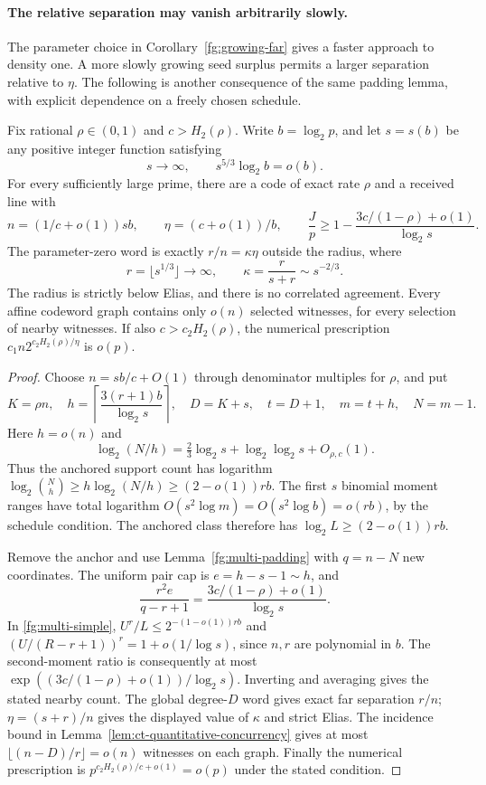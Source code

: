 \paragraph{The relative separation may vanish arbitrarily slowly.}
The parameter choice in Corollary~\ref{fg:growing-far} gives a faster
approach to density one. A more slowly growing seed surplus permits
a larger separation relative to $\eta$. The following is another consequence of the same padding
lemma, with explicit dependence on a freely chosen schedule.

\begin{corollary}
\label{fg:slow-separation}
Fix rational $\rho\in(0,1)$ and $c>H_2(\rho)$. Write $b=\log_2p$,
and let $s=s(b)$ be any positive integer function satisfying
\[
 s\longrightarrow\infty,\qquad s^{5/3}\log_2b=o(b).
\]
For every sufficiently large prime, there are a code of exact rate
$\rho$ and a received line with
\[
 n=(1/c+o(1))sb,\qquad \eta=(c+o(1))/b,\qquad
 \frac Jp\ge1-\frac{3c/(1-\rho)+o(1)}{\log_2s}.
\]
The parameter-zero word is exactly $r/n=\kappa\eta$ outside the radius,
where
\[
 r=\lfloor s^{1/3}\rfloor\to\infty,
 \qquad \kappa=\frac r{s+r}\sim s^{-2/3}.
\]
The radius is strictly below Elias, and there is no correlated agreement.
Every affine codeword graph contains only $o(n)$ selected witnesses,
for every selection of nearby witnesses. If also $c>c_2H_2(\rho)$,
the numerical prescription $c_1n2^{c_2H_2(\rho)/\eta}$ is $o(p)$.
\end{corollary}
\begin{proof}
Choose $n=sb/c+O(1)$ through denominator multiples for $\rho$, and put
\[
 K=\rho n,\quad h=\left\lceil\frac{3(r+1)b}{\log_2s}\right\rceil,
 \quad D=K+s,\quad t=D+1,\quad m=t+h,\quad N=m-1.
\]
Here $h=o(n)$ and
\[
 \log_2(N/h)=\tfrac23\log_2s+\log_2\log_2s+O_{\rho,c}(1).
\]
Thus the anchored support count has logarithm
$\log_2\binom Nh\ge h\log_2(N/h)\ge(2-o(1))rb$.
The first $s$ binomial moment ranges have total logarithm
$O(s^2\log m)=O(s^2\log b)=o(rb)$, by the schedule condition.
The anchored class therefore has
$\log_2L\ge(2-o(1))rb$.

Remove the anchor and use Lemma~\ref{fg:multi-padding} with
$q=n-N$ new coordinates. The uniform pair cap is
$e=h-s-1\sim h$, and
\[
 \frac{r^2e}{q-r+1}
 =\frac{3c/(1-\rho)+o(1)}{\log_2s}.
\]
In \eqref{fg:multi-simple}, $U^r/L\le2^{-(1-o(1))rb}$ and
$(U/(R-r+1))^r=1+o(1/\log s)$, since $n,r$ are polynomial in $b$.
The second-moment ratio is consequently at most
$\exp((3c/(1-\rho)+o(1))/\log_2s)$.
Inverting and averaging gives the stated nearby count.
The global degree-$D$ word gives exact far separation $r/n$;
$\eta=(s+r)/n$ gives the displayed value of $\kappa$ and strict Elias.
The incidence bound in Lemma~\ref{lem:ct-quantitative-concurrency}
gives at most $\lfloor(n-D)/r\rfloor=o(n)$ witnesses on each graph.
Finally the numerical prescription is
$p^{c_2H_2(\rho)/c+o(1)}=o(p)$ under the stated condition.
\end{proof}

